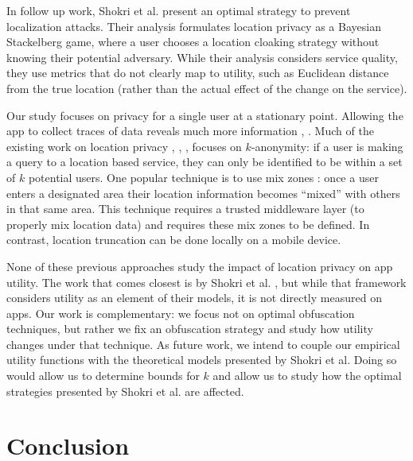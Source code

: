 \documentclass[10pt, conference, compsocconf]{IEEEtran}
\newcommand{\comment}[3][\color{red}]{{#1{[{#2}: {#3}]}}}
\newcommand{\jeff}[1]{\comment[\color{green}]{JSF}{#1}}
\begin{document}
In follow up work, Shokri et al. \cite{Shokri:2012} present an
optimal strategy to prevent localization attacks.
Their analysis formulates location privacy as a Bayesian Stackelberg 
game, where a user chooses a location cloaking strategy without 
knowing their potential adversary.
While their analysis considers service quality, they use metrics that do 
not clearly map to utility, such as Euclidean distance from the 
true location (rather than the actual effect of the change on the service).

Our study focuses on privacy for a single user at a stationary point.
Allowing the app to collect traces of data reveals much more
information \cite{Gruteser:2005}, \cite{Golle:2009}.  Much of the
existing work on location privacy \cite{Beresford:2004}, \cite{Bettini:2005},
\cite{Hoh:2005}, \cite{Gruteser:2003} focuses on $k$-anonymity: if a
user is making a query to a location based service, they can only be
identified to be within a set of $k$ potential users.  
One popular
technique is to use mix zones \cite{Beresford:2004}: once a user enters 
a designated area their location information becomes ``mixed'' with 
others in that same area.  This technique requires a trusted middleware 
layer (to properly mix location data) and requires these mix zones 
to be defined.  In contrast, location truncation can be done locally
on a mobile device.

None of these previous approaches study the impact of location privacy
on app utility.  The work that comes closest is by Shokri et
al. \cite{Shokri:2012}, but while that framework considers utility as
an element of their models, it is not directly measured on apps.  Our
work is complementary: we focus not on optimal obfuscation techniques,
but rather we fix an obfuscation strategy and study how utility
changes under that technique.  As future work, we intend to couple our 
empirical utility functions with the theoretical models presented by
Shokri et al.
Doing so would allow us to determine bounds for $k$ and allow us to study 
how the optimal strategies presented by Shokri et al.
are affected.


\section{Conclusion}
\end{document}
